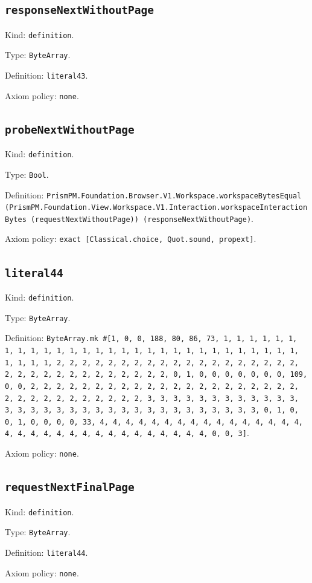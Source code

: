 \documentclass[11pt]{article}
\begin{document}
\subsection*{\texttt{responseNextWithoutPage}}
\noindent Kind: \texttt{definition}.\par
\noindent Type: \texttt{ByteArray}.\par
\noindent Definition: \texttt{literal43}.\par
\noindent Axiom policy: \texttt{none}.\par
\subsection*{\texttt{probeNextWithoutPage}}
\noindent Kind: \texttt{definition}.\par
\noindent Type: \texttt{Bool}.\par
\noindent Definition: \texttt{PrismPM.Foundation.Browser.V1.Workspace.workspaceBytesEqual (PrismPM.Foundation.View.Workspace.V1.Interaction.workspaceInteractionBytes (requestNextWithoutPage)) (responseNextWithoutPage)}.\par
\noindent Axiom policy: \texttt{exact [Classical.choice, Quot.sound, propext]}.\par
\subsection*{\texttt{literal44}}
\noindent Kind: \texttt{definition}.\par
\noindent Type: \texttt{ByteArray}.\par
\noindent Definition: \texttt{ByteArray.mk \#[1, 0, 0, 188, 80, 86, 73, 1, 1, 1, 1, 1, 1, 1, 1, 1, 1, 1, 1, 1, 1, 1, 1, 1, 1, 1, 1, 1, 1, 1, 1, 1, 1, 1, 1, 1, 1, 1, 1, 1, 2, 2, 2, 2, 2, 2, 2, 2, 2, 2, 2, 2, 2, 2, 2, 2, 2, 2, 2, 2, 2, 2, 2, 2, 2, 2, 2, 2, 2, 2, 2, 2, 0, 1, 0, 0, 0, 0, 0, 0, 0, 109, 0, 0, 2, 2, 2, 2, 2, 2, 2, 2, 2, 2, 2, 2, 2, 2, 2, 2, 2, 2, 2, 2, 2, 2, 2, 2, 2, 2, 2, 2, 2, 2, 2, 2, 3, 3, 3, 3, 3, 3, 3, 3, 3, 3, 3, 3, 3, 3, 3, 3, 3, 3, 3, 3, 3, 3, 3, 3, 3, 3, 3, 3, 3, 3, 3, 3, 0, 1, 0, 0, 1, 0, 0, 0, 0, 33, 4, 4, 4, 4, 4, 4, 4, 4, 4, 4, 4, 4, 4, 4, 4, 4, 4, 4, 4, 4, 4, 4, 4, 4, 4, 4, 4, 4, 4, 4, 4, 4, 0, 0, 3]}.\par
\noindent Axiom policy: \texttt{none}.\par
\subsection*{\texttt{requestNextFinalPage}}
\noindent Kind: \texttt{definition}.\par
\noindent Type: \texttt{ByteArray}.\par
\noindent Definition: \texttt{literal44}.\par
\noindent Axiom policy: \texttt{none}.\par
\end{document}
